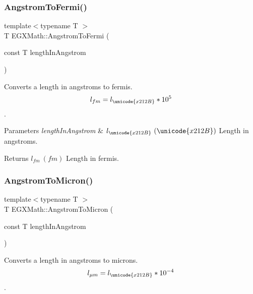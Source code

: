 \subsubsection{\texorpdfstring{Angstrom\+To\+Fermi()}{AngstromToFermi()}}
{\footnotesize\ttfamily template$<$typename T $>$ \\
T E\+G\+X\+Math\+::\+Angstrom\+To\+Fermi (\begin{DoxyParamCaption}\item[{const T}]{length\+In\+Angstrom }\end{DoxyParamCaption})}



Converts a length in angstroms to fermis. \[ l_{fm}=l_{\unicode{x212B}} * 10^{5} \]. 


\begin{DoxyParams}{Parameters}
{\em length\+In\+Angstrom} & $ l_{\unicode{x212B}}\ (\unicode{x212B})$ Length in angstroms. \\
\hline
\end{DoxyParams}
\begin{DoxyReturn}{Returns}
$ l_{fm}\ (fm)$ Length in fermis. 
\end{DoxyReturn}
\mbox{\label{group___e_g_x_math-_conversions-_length_conversions-_non-_s_i-_angstrom-_non-_s_i_ga097787c82296d2767637cd15101ec272}} 
\subsubsection{\texorpdfstring{Angstrom\+To\+Micron()}{AngstromToMicron()}}
{\footnotesize\ttfamily template$<$typename T $>$ \\
T E\+G\+X\+Math\+::\+Angstrom\+To\+Micron (\begin{DoxyParamCaption}\item[{const T}]{length\+In\+Angstrom }\end{DoxyParamCaption})}



Converts a length in angstroms to microns. \[ l_{\mu m}=l_{\unicode{x212B}} * 10^{-4} \]. 


